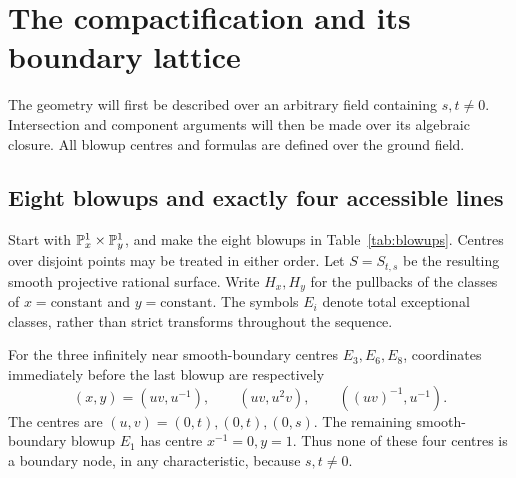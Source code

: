 \section{The compactification and its boundary lattice}\label{sec:surface}

The geometry will first be described over an arbitrary field containing
\(s,t\ne0\). Intersection and component arguments will then be made
over its algebraic closure. All blowup centres and formulas are defined
over the ground field.

\subsection{Eight blowups and exactly four accessible lines}

Start with \(\mathbb P^1_x\times\mathbb P^1_y\), and make the eight blowups
in Table~\ref{tab:blowups}. Centres over disjoint points may be treated
in either order. Let \(S=S_{t,s}\) be the resulting smooth projective
rational surface. Write \(H_x,H_y\) for the pullbacks of the classes
of \(x=\text{constant}\) and \(y=\text{constant}\). The symbols
\(E_i\) denote total exceptional classes, rather than strict
transforms throughout the sequence.



For the three infinitely near smooth-boundary centres \(E_3,E_6,E_8\),
coordinates immediately before the last blowup are respectively
\begin{equation}\label{eq:pre-blowup-charts}
(x,y)=(uv,u^{-1}),\qquad
(uv,u^2v),\qquad ((uv)^{-1},u^{-1}).
\end{equation}
The centres are \((u,v)=(0,t),(0,t),(0,s)\). The remaining
smooth-boundary blowup \(E_1\) has centre \(x^{-1}=0,y=1\).
Thus none of these four centres is a boundary node, in any
characteristic, because \(s,t\ne0\).

